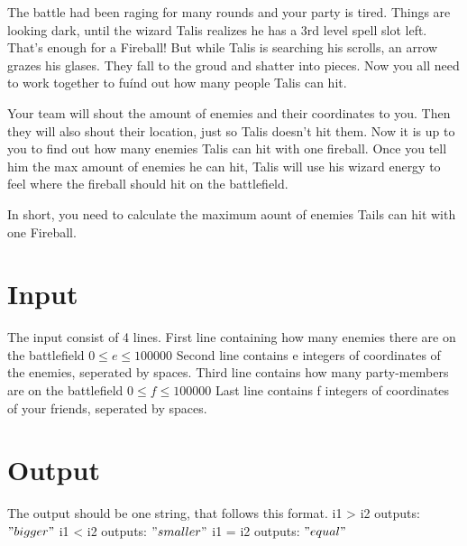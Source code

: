 
The battle had been raging for many rounds and your party is tired. Things are looking dark, until the wizard Talis realizes he has a 3rd level spell slot left. 
That's enough for a Fireball! But while Talis is searching his scrolls, an arrow grazes his glases. They fall to the groud and shatter into pieces. Now you all need
to work together to fuínd out how many people Talis can hit. 

Your team will shout the amount of enemies and their coordinates to you. Then they will also shout their location, just so Talis doesn't hit them. Now it is up to you to find out how many enemies Talis can hit with one fireball. Once you tell him the max amount of enemies he can hit, Talis will use his wizard energy to feel where
the fireball should hit on the battlefield. 

In short, you need to calculate the maximum aount of enemies Tails can hit with one Fireball.

\section*{Input}

The input consist of 4 lines. 
First line containing how many enemies there are on the battlefield $0 \leq e \leq 100000$
Second line contains e integers of coordinates of the enemies, seperated by spaces.
Third line contains how many party-members are on the battlefield $0 \leq f \leq 100000$
Last line contains f integers of coordinates of your friends, seperated by spaces.

\section*{Output}

The output should be one string, that follows this format.
i1 > i2 outputs: $"bigger"$
i1 < i2 outputs: $"smaller"$ 
i1 = i2 outputs: $"equal"$
